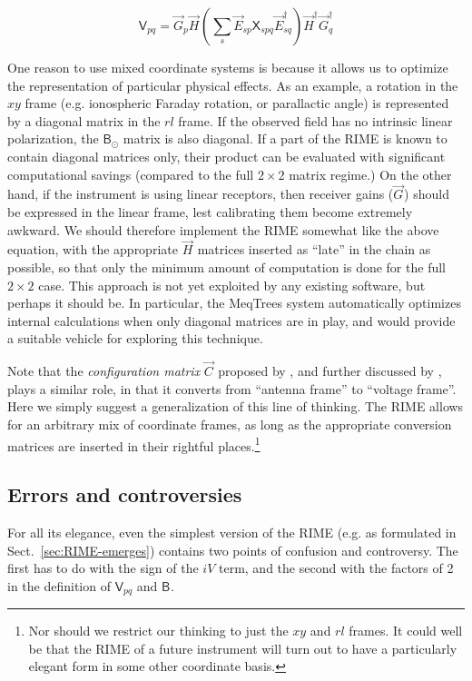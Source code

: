 \documentclass[]{aa}
\newcommand{\jones}[2]{\vec {#1}_{#2}}
\newcommand{\jonesT}[2]{\vec {#1}^\dagger_{#2}}
\newcommand{\coh}[2]{\mathsf{{#1}}_{{#2}}}
\begin{document}
\[
\coh{V}{pq} = \jones{G}{p} \jones{H}{} \left ( \sum_{s} \jones{E}{sp} \coh{X}{spq} 
\jonesT{E}{sq} \right ) \jonesT{H}{} \jonesT{G}{q}
\] 

One reason to use mixed coordinate systems is because it allows us to optimize the representation of particular physical effects. As an example, a rotation in the $xy$ frame (e.g. ionospheric Faraday rotation, or parallactic angle) is represented by a diagonal matrix in the $rl$ frame. If the observed field has no intrinsic linear polarization, the $\coh{B}{\odot}$ matrix is also diagonal. If a part of the RIME is known to contain diagonal matrices only, their product can be evaluated with significant computational savings (compared to the full $2\times2$ matrix regime.) On the other hand, if the instrument is using linear receptors, then receiver gains ($\jones{G}{}$) should be expressed in the linear frame, lest calibrating them become extremely awkward. We should therefore implement the RIME somewhat like the above equation, with the appropriate $\jones{H}{}$ matrices inserted as ``late'' in the chain as possible, so that only the minimum amount of computation is done for the full $2\times2$ case. This approach is not yet exploited by any existing software, but perhaps it should be. In particular, the MeqTrees system \citep{meqtrees} automatically optimizes internal calculations when only diagonal matrices are in play, and would provide a suitable vehicle for exploring this technique.

Note that the {\em configuration matrix} $\jones{C}{}$ proposed by \citet{ME1}, and further discussed by \citet{JEN:note185}, plays a similar role, in that it converts from ``antenna frame'' to ``voltage frame''. Here we simply suggest a generalization of this line of thinking. The RIME allows for an arbitrary mix of coordinate frames, as long as the appropriate conversion matrices are inserted in their rightful places.\footnote{Nor should we restrict our thinking to just the $xy$ and $rl$ frames. It could well be that the RIME of a future instrument will turn out to have a particularly elegant form in some other coordinate basis.}

\subsection{Errors and controversies}

For all its elegance, even the simplest version of the RIME (e.g. as formulated in Sect.~\ref{sec:RIME-emerges}) contains two points of confusion and controversy. The first has to do with the sign of the $iV$ term, and the second with the factors of 2 in the definition of $\coh{V}{pq}$ and $\coh{B}{}$.
\end{document}

